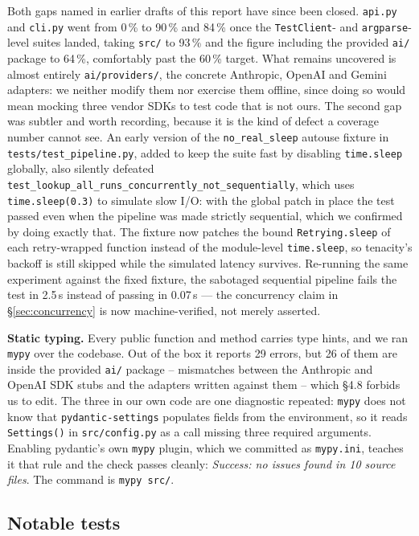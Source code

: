 \documentclass[11pt,a4paper]{article}
\begin{document}
Both gaps named in earlier drafts of this report have since been closed. \texttt{api.py} and \texttt{cli.py} went from 0\,\% to 90\,\% and 84\,\% once the \texttt{TestClient}- and \texttt{argparse}-level suites landed, taking \texttt{src/} to 93\,\% and the figure including the provided \texttt{ai/} package to 64\,\%, comfortably past the 60\,\% target. What remains uncovered is almost entirely \texttt{ai/providers/}, the concrete Anthropic, OpenAI and Gemini adapters: we neither modify them nor exercise them offline, since doing so would mean mocking three vendor SDKs to test code that is not ours. The second gap was subtler and worth recording, because it is the kind of defect a coverage number cannot see. An early version of the \texttt{no\_real\_sleep} autouse fixture in \texttt{tests/test\_pipeline.py}, added to keep the suite fast by disabling \texttt{time.sleep} globally, also silently defeated \texttt{test\_lookup\_all\_runs\_concurrently\_not\_sequentially}, which uses \texttt{time.sleep(0.3)} to simulate slow I/O: with the global patch in place the test passed even when the pipeline was made strictly sequential, which we confirmed by doing exactly that. The fixture now patches the bound \texttt{Retrying.sleep} of each retry-wrapped function instead of the module-level \texttt{time.sleep}, so tenacity's backoff is still skipped while the simulated latency survives. Re-running the same experiment against the fixed fixture, the sabotaged sequential pipeline fails the test in 2.5\,s instead of passing in 0.07\,s --- the concurrency claim in \S\ref{sec:concurrency} is now machine-verified, not merely asserted.

\textbf{Static typing.} Every public function and method carries type hints, and we ran \texttt{mypy} over the codebase. Out of the box it reports 29 errors, but 26 of them are inside the provided \texttt{ai/} package -- mismatches between the Anthropic and OpenAI SDK stubs and the adapters written against them -- which \S4.8 forbids us to edit. The three in our own code are one diagnostic repeated: \texttt{mypy} does not know that \texttt{pydantic-settings} populates fields from the environment, so it reads \texttt{Settings()} in \texttt{src/config.py} as a call missing three required arguments. Enabling pydantic's own \texttt{mypy} plugin, which we committed as \texttt{mypy.ini}, teaches it that rule and the check passes cleanly: \emph{Success: no issues found in 10 source files}. The command is \texttt{mypy src/}.

\subsection{Notable tests}
\end{document}
